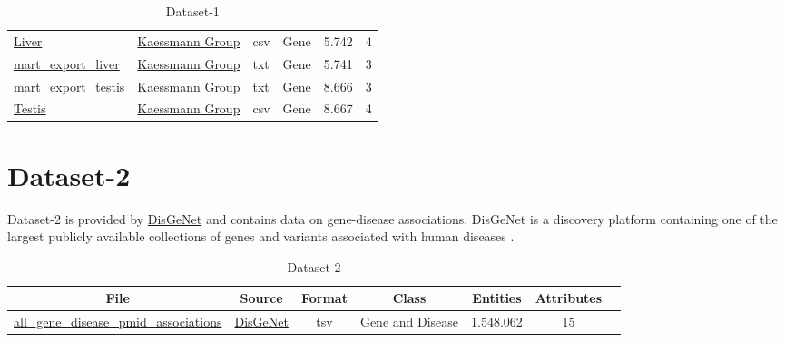 \documentclass[11pt,titlepage,oneside,openany]{book}
\begin{document}
\begin{table}[!ht]
\begin{footnotesize}
\begin{tabularx}{\textwidth}{|l|l|l|l|l|l|}
	\href{https://nahorgebre.s3.amazonaws.com/Liver.csv}{Liver} & \href{https://www.zmbh.uni-heidelberg.de/kaessmann/}{Kaessmann Group}  & csv & Gene & 5.742 & 4 \\
	
	\href{https://nahorgebre.s3.amazonaws.com/mart_export_liver.txt}{mart\_export\_liver} & \href{https://www.zmbh.uni-heidelberg.de/kaessmann/}{Kaessmann Group} & txt & Gene & 5.741 & 3 \\
	
	\href{https://nahorgebre.s3.amazonaws.com/mart_export_testis.txt}{mart\_export\_testis} & \href{https://www.zmbh.uni-heidelberg.de/kaessmann/}{Kaessmann Group} & txt & Gene & 8.666 & 3 \\
	
	\href{https://nahorgebre.s3.amazonaws.com/Testis.csv}{Testis} & \href{https://www.zmbh.uni-heidelberg.de/kaessmann/}{Kaessmann Group}  & csv & Gene & 8.667 & 4 \\
  \hline
\end{tabularx}
\end{footnotesize}
\caption{Dataset-1}
\end{table}

\section{Dataset-2}
\label{dataset2}
Dataset-2 is provided by \href{https://www.disgenet.org/}{DisGeNet} and contains data on gene-disease associations. DisGeNet is a discovery platform containing one of the largest publicly available collections of genes and variants associated with human diseases \cite{Piero2019TheDK}.
 
\begin{table}[!ht]
\setlength\extrarowheight{2pt} %
\begin{footnotesize}
\begin{tabularx}{\textwidth}{|C|C|C|C|C|C|C|}
\hline
\textbf{File} & \textbf{Source} & \textbf{Format} & \textbf{Class} & \textbf{Entities} & \textbf{Attributes}  \\\hline

	\href{https://nahorgebre.s3.amazonaws.com/all_gene_disease_pmid_associations.tsv}{all\_gene\_disease\_pmid\_associations} & \href{https://www.disgenet.org/}{DisGeNet}  & tsv & Gene and Disease & 1.548.062 & 15 \\
  \hline
\end{tabularx}
\end{footnotesize}
\caption{Dataset-2}
\end{table}
\end{document}
